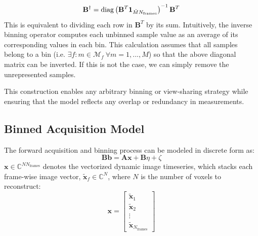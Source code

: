 \documentclass[11pt]{article}
\begin{document}
\begin{equation*}
    \mathbf{B}^\dagger = \operatorname{diag} \left(\mathbf{B}^T\mathbf{1}_{\tilde{M}N_\mathrm{frames}}\right)^{-1}\mathbf{B}^T \\
\end{equation*}
This is equivalent to dividing each row in $\mathbf{B}^T$ by its sum.
Intuitively, the inverse binning operator computes each unbinned sample value as an average of its corresponding values in each bin. 
This calculation assumes that all samples belong to a bin (i.e. $\exists f: m \in \mathcal{M}_f\ \forall m = 1,...,M$) so that the above diagonal matrix can be inverted.
If this is not the case, we can simply remove the unrepresented samples.

This construction enables any arbitrary binning or view-sharing strategy while ensuring that the model reflects any overlap or redundancy in measurements.

\subsection{Binned Acquisition Model} \label{sec:binned_acquisition_model}
The forward acquisition and binning process can be modeled in discrete form as:
\begin{equation} \label{eq:discrete_fwd}
    \mathbf{B}\mathbf{b} = \mathbf{A}\mathbf{x} + \mathbf{B}\eta + \zeta
\end{equation}
$\mathbf{x} \in \mathbb{C}^{NN_\mathrm{frames}}$ denotes the vectorized dynamic image timeseries, which stacks each frame-wise image vector, $\tilde{\mathbf{x}}_f \in \mathbb{C}^N$, where $N$ is the number of voxels to reconstruct:
\begin{equation*}
    \mathbf{x} = \begin{bmatrix} \tilde{\mathbf{x}}_1 \\ \tilde{\mathbf{x}}_2 \\ \vdots \\ \tilde{\mathbf{x}}_{N_\mathrm{frames}} \end{bmatrix}
\end{equation*}
\end{document}
